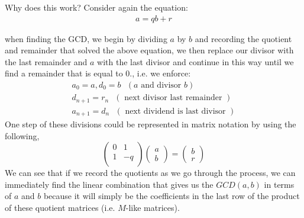 Why does this work? Consider again the equation:
\begin{align}
    a=qb+r \nonumber
\end{align}

when finding the GCD, we begin by dividing $a$ by $b$ and recording the quotient and remainder that solved the above equation, we then replace our divisor with the last remainder and $a$ with the last divisor and continue in this way until we find a remainder that is equal to $0$., i.e. we enforce:
\begin{align}
    a_0=a, d_0=b \ \ \ (a\text{ and divisor }b)\nonumber\\
    d_{n+1}= r_n  \ \ \ (\text{ next divisor last remainder })\nonumber \\
    a_{n+1}= d_n \ \ \ (\text{ next dividend is last divisor })\nonumber 
\end{align}
One step of these divisions could be represented in matrix notation by using the following,
\begin{equation}
  \left( {\begin{array}{cc}
   0 & 1 \\
   1 & -q \\
  \end{array} } \right)\left( {\begin{array}{c}
   a\\
   b
  \end{array} } \right)=\left( {\begin{array}{c}
   b\\
   r
  \end{array} } \right)
\nonumber
\end{equation}
We can see that if we record the quotients as we go through the process, we can immediately find the linear combination that gives us the $GCD(a,b)$ in terms of $a$ and $b$ because it will simply be the coefficients in the last row of the product of these quotient matrices (i.e. $M$-like matrices).

